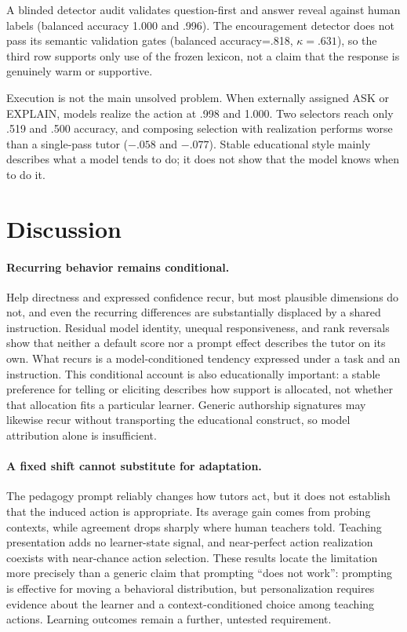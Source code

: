 \documentclass[11pt]{article}
\begin{document}
A blinded detector audit validates question-first and answer reveal against
human labels (balanced accuracy 1.000 and .996). The encouragement detector does
not pass its semantic validation gates (balanced accuracy=.818,
$\kappa=.631$), so the third row supports only use of the frozen lexicon, not a
claim that the response is genuinely warm or supportive.

Execution is not the main unsolved problem. When externally assigned ASK or
EXPLAIN, models realize the action at .998 and 1.000. Two selectors reach only
.519 and .500 accuracy, and composing selection with realization performs worse
than a single-pass tutor ($-.058$ and $-.077$). Stable educational style mainly
describes what a model tends to do; it does not show that the model knows when to
do it.

\section{Discussion}

\paragraph{Recurring behavior remains conditional.}
Help directness and expressed confidence recur, but most plausible dimensions do
not, and even the recurring differences are substantially displaced by a shared
instruction. Residual model identity, unequal responsiveness, and rank reversals
show that neither a default score nor a prompt effect describes the tutor on its
own. What recurs is a model-conditioned tendency expressed under a task and an
instruction. This conditional account is also educationally important: a stable
preference for telling or eliciting describes how support is allocated, not
whether that allocation fits a particular learner. Generic authorship signatures
may likewise recur without transporting the educational construct, so model
attribution alone is insufficient.

\paragraph{A fixed shift cannot substitute for adaptation.}
The pedagogy prompt reliably changes how tutors act, but it does not establish
that the induced action is appropriate. Its average gain comes from probing
contexts, while agreement drops sharply where human teachers told. Teaching
presentation adds no learner-state signal, and near-perfect action realization
coexists with near-chance action selection. These results locate the limitation
more precisely than a generic claim that prompting ``does not work'': prompting
is effective for moving a behavioral distribution, but personalization requires
evidence about the learner and a context-conditioned choice among teaching
actions. Learning outcomes remain a further, untested requirement.
\end{document}
